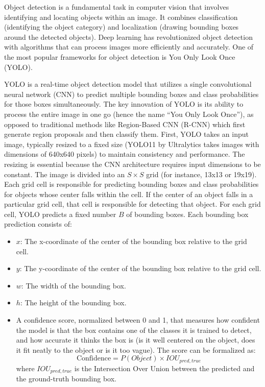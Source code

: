 \documentclass[12pt]{article}
\begin{document}
Object detection is a fundamental task in computer vision that involves identifying and locating objects within an image. It combines classification (identifying the object category) and localization (drawing bounding boxes around the detected objects). Deep learning has revolutionized object detection with algorithms that can process images more efficiently and accurately. One of the most popular frameworks for object detection is You Only Look Once (YOLO).

YOLO is a real-time object detection model that utilizes a single convolutional neural network (CNN) to predict multiple bounding boxes and class probabilities for those boxes simultaneously. The key innovation of YOLO is its ability to process the entire image in one go (hence the name “You Only Look Once”), as opposed to traditional methods like Region-Based CNN (R-CNN) which first generate region proposals and then classify them.
First, YOLO takes an input image, typically resized to a fixed size (YOLO11 by Ultralytics takes images with dimensions of 640x640 pixels) to maintain consistency and performance. The resizing is essential because the CNN architecture requires input dimensions to be constant.
The image is divided into an \(S \times S\) grid (for instance, 13x13 or 19x19). Each grid cell is responsible for predicting bounding boxes and class probabilities for objects whose center falls within the cell. If the center of an object falls in a particular grid cell, that cell is responsible for detecting that object.
For each grid cell, YOLO predicts a fixed number \(B\) of bounding boxes. Each bounding box prediction consists of:
\begin{itemize}
  \item \(x\): The x-coordinate of the center of the bounding box relative to the grid cell.
  \item \(y\): The y-coordinate of the center of the bounding box relative to the grid cell.
  \item \(w\): The width of the bounding box.
  \item \(h\): The height of the bounding box.
  \item A confidence score, normalized between 0 and 1,  that measures how confident the model is that the box contains one of the classes it is trained to detect, and how accurate it thinks the box is (is it well centered on the object, does it fit neatly to the object or is it too vague). The score can be formalized as:
    \[
      \text{Confidence} = P(Object) \times IOU_{pred, true}
    \]
    where \(IOU_{pred, true}\) is the Intersection Over Union between the predicted and the ground-truth bounding box.
\end{itemize}
\end{document}

